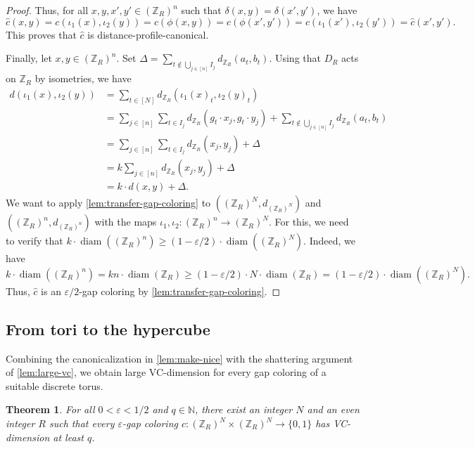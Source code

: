 \documentclass[11pt]{article}
\DeclareMathOperator{\diam}{diam}
\newtheorem{theorem}{Theorem}
\theoremstyle{remark}
\begin{document}
\begin{proof}
    Thus, for all $x, y, x', y' \in (\mathbb{Z}_R)^n$ such that $\delta(x, y) = \delta(x', y')$, we have \[\widehat{c}(x, y) = c(\iota_1(x), \iota_2(y)) = c(\phi(x, y)) = c(\phi(x', y')) = c(\iota_1(x'), \iota_2(y')) = \widehat{c}(x', y').\]
    This proves that $\widehat{c}$ is distance-profile-canonical.
    
    Finally, let $x, y \in (\mathbb{Z}_R)^n$.
    Set $\Delta = \sum_{t \notin \bigcup_{j \in [n]}I_j}d_{\mathbb{Z}_R}(a_t, b_t)$.
    Using that $D_R$ acts on $\mathbb{Z}_R$ by isometries, we have \begin{align*}
        d(\iota_1(x), \iota_2(y)) &= \sum_{t \in [N]}d_{\mathbb{Z}_R}(\iota_1(x)_t, \iota_2(y)_t) \\
            &= \sum_{j \in [n]}\sum_{t \in I_j} d_{\mathbb{Z}_R}(g_t \cdot x_j, g_t \cdot y_j) + \sum_{t \notin \bigcup_{j \in [n]}I_j}d_{\mathbb{Z}_R}(a_t, b_t) \\
            &= \sum_{j \in [n]}\sum_{t \in I_j} d_{\mathbb{Z}_R}(x_j, y_j) + \Delta \\
            &= k \sum_{j \in [n]}d_{\mathbb{Z}_R}(x_j, y_j) + \Delta \\
            &= k \cdot d(x, y) + \Delta.
    \end{align*} 
    We want to apply \cref{lem:transfer-gap-coloring} to $((\mathbb{Z}_R)^N, d_{(\mathbb{Z}_R)^N})$ and $((\mathbb{Z}_R)^n, d_{(\mathbb{Z}_R)^n})$ with the maps $\iota_1, \iota_2 : (\mathbb{Z}_R)^n \to (\mathbb{Z}_R)^N$.
    For this, we need to verify that $k \cdot \diam((\mathbb{Z}_R)^n) \geq (1 - \varepsilon/2) \cdot \diam((\mathbb{Z}_R)^N)$.
    Indeed, we have \[k \cdot \diam((\mathbb{Z}_R)^n) = kn \cdot \diam(\mathbb{Z}_R) \geq (1 - \varepsilon/2) \cdot N \cdot \diam(\mathbb{Z}_R) = (1 - \varepsilon/2) \cdot \diam((\mathbb{Z}_R)^N).\]
    Thus, $\widehat{c}$ is an $\varepsilon/2$-gap coloring by \cref{lem:transfer-gap-coloring}.
\end{proof}

\subsection{From tori to the hypercube}

Combining the canonicalization in \cref{lem:make-nice} with the shattering argument of \cref{lem:large-vc}, we obtain large VC-dimension for every gap coloring of a suitable discrete torus.

\begin{theorem}\label{thm:exists-torus}
    For all $0 < \varepsilon < 1/2$ and $q \in \mathbb{N}$, there exist an integer $N$ and an even integer $R$ such that every $\varepsilon$-gap coloring $c : (\mathbb{Z}_R)^N \times (\mathbb{Z}_R)^N \to \{0, 1\}$ has VC-dimension at least $q$.
\end{theorem}
\end{document}
